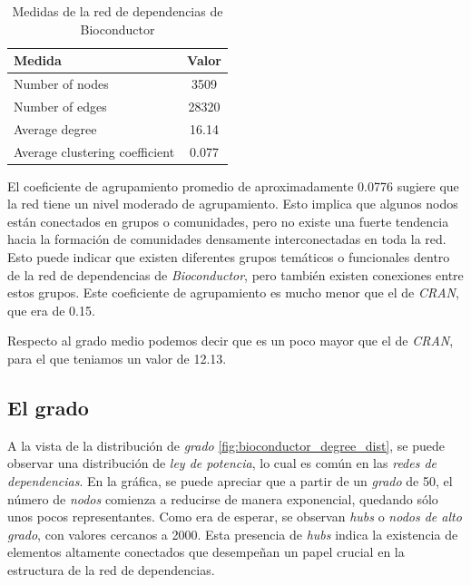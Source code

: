 \begin{table}[ht!]
    \begin{center}
        \begin{tabular}{|l|c|}
            \hline
            \textbf{Medida}                & \textbf{Valor} \\
            \hline
            Number of nodes                & 3509           \\
            Number of edges                & 28320          \\
            Average degree                 & 16.14          \\
            Average clustering coefficient & 0.077          \\
            \hline
        \end{tabular}
        \caption{Medidas de la red de dependencias de Bioconductor}
        \label{tab:Medidas de la red de dependencias de Bioconductor}
    \end{center}
\end{table}

El coeficiente de agrupamiento promedio de aproximadamente 0.0776 sugiere que la red tiene un nivel moderado de agrupamiento.
Esto implica que algunos nodos están conectados en grupos o comunidades, pero no existe una fuerte tendencia hacia la formación
de comunidades densamente interconectadas en toda la red. Esto puede indicar que existen diferentes grupos temáticos o
funcionales dentro de la red de dependencias de \textit{Bioconductor}, pero también existen conexiones entre estos grupos.
Este coeficiente de agrupamiento es mucho menor que el de \textit{CRAN}, que era de 0.15.

Respecto al grado medio podemos decir que es un poco mayor que el de \textit{CRAN},
para el que teniamos un valor de 12.13.

\subsection{El grado}

A la vista de la distribución de \emph{grado} \ref{fig:bioconductor_degree_dist}, se puede observar una distribución
de \emph{ley de potencia}, lo cual es común en las \emph{redes de dependencias}.
En la gráfica, se puede apreciar que a partir de un \emph{grado} de 50, el
número de \emph{nodos} comienza a reducirse de manera exponencial, quedando
sólo unos pocos representantes. Como era de esperar, se observan \emph{hubs}
o \emph{nodos de alto grado}, con valores cercanos a 2000. Esta presencia
de \emph{hubs} indica la existencia de elementos altamente conectados que
desempeñan un papel crucial en la estructura de la red de dependencias.

